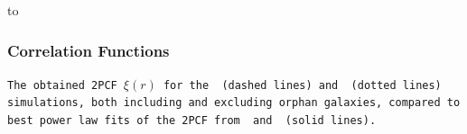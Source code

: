 %        
%


{
    {\vbox to }
    \begin{frame}
        \frametitle{Correlation Functions}
        \vspace{6.5cm}
        \tiny\texttt{The obtained 2PCF $\xi(r)$ for the \gsmall\ (dashed lines) and \glarge\ (dotted lines) simulations, both including and excluding orphan galaxies, compared to best power law fits of the 2PCF from \cite{LiWhite} and \cite{Correlation1} (solid lines).
        }
    \end{frame}
}


